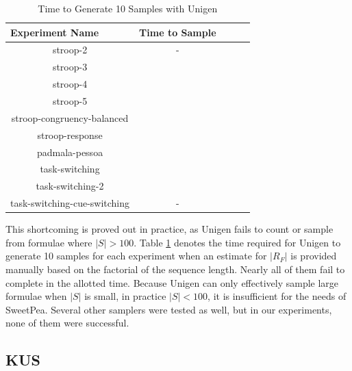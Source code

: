\begin{table}[t]
  \centering
  \caption{Time to Generate 10 Samples with Unigen}
\begin{tabular}{|c|c|c|c|c|}
\hline
\multicolumn{1}{|l|}{Experiment Name} & Time to Sample  \\ \hline
stroop-2                              & -               \\ \hline
stroop-3                              &            \\ \hline %
stroop-4                              &        \\ \hline %
stroop-5                              &        \\ \hline
stroop-congruency-balanced            &        \\ \hline
stroop-response                       &        \\ \hline
padmala-pessoa                        &        \\ \hline
task-switching                        &        \\ \hline
task-switching-2                      &        \\ \hline
task-switching-cue-switching          & -               \\ \hline
\end{tabular}
\label{tab:benchmark_experiments_unigen}%
\end{table}

This shortcoming is proved out in practice, as Unigen fails to count or sample from formulae where $|S| > 100$. Table \ref{tab:benchmark_experiments_unigen} denotes the time required for Unigen to generate 10 samples for each experiment when an estimate for $|R_F|$ is provided manually based on the factorial of the sequence length. Nearly all of them fail to complete in the allotted time. Because Unigen can only effectively sample large formulae when $|S|$ is small, in practice $|S| < 100$, it is insufficient for the needs of SweetPea. Several other samplers were tested as well, but in our experiments, none of them were successful.


\subsection{KUS}

